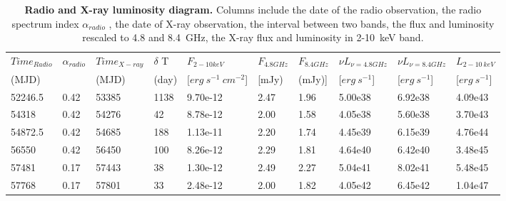 \begin{table}
\centering
\caption{{\bf Radio and X-ray luminosity diagram.} Columns include the date of the radio observation, the radio spectrum index $\alpha_{radio}$ , the date of X-ray observation, the interval between two bands, the flux and luminosity rescaled to 4.8 and 8.4~GHz, the X-ray flux and luminosity in 2-10~keV band.}
\label{tab:table4}
\begin{tabular}{llllllllll}
\hline
\hline

$Time_{Radio}$ &  $\alpha_{radio}$ & $Time_{X-ray}$ & $\delta$ T & $F_{2-10keV}$ & $F_{4.8GHz}$ & $F_{8.4GHz}$ &  $\nu L_{\nu=4.8GHz}$ &  $\nu L_{\nu=8.4GHz}$ & $L_{2-10~keV}$ \\ 
(MJD)  &  & (MJD)  &(day)  &[$erg~s^{-1}~cm^{-2}$] & [mJy)& (mJy)]& [$erg~s^{-1} $] & [$erg~s^{-1} $]& [$erg~s^{-1} $]\\
\hline

52246.5 & 0.42 & 53385 & 1138 & 9.70e-12 & 2.47 & 1.96 & 5.00e38 & 6.92e38 & 4.09e43 \\ 
54318 & 0.42 & 54276 & 42 & 8.78e-12 & 2.00 & 1.58 & 4.05e38 & 5.60e38 & 3.70e43 \\ 
54872.5 & 0.42 & 54685 & 188 & 1.13e-11 & 2.20 & 1.74 & 4.45e39 & 6.15e39 & 4.76e44 \\ 
56550 & 0.42 & 56450 & 100 & 8.26e-12 & 2.29 & 1.81 & 4.64e40 & 6.42e40 & 3.48e45 \\ 
57481 & 0.17 & 57443 & 38 & 1.30e-12 & 2.49 & 2.27 & 5.04e41 & 8.02e41 & 5.48e45 \\ 
57768 & 0.17 & 57801 & 33 & 2.48e-12 & 2.00 & 1.82 & 4.05e42 & 6.45e42 & 1.04e47 \\ \hline

\end{tabular}
\end{table}